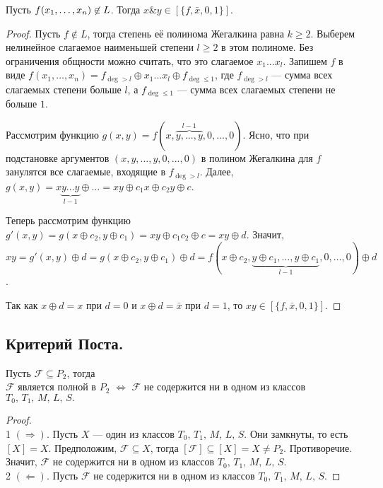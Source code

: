 \begin{lemma} Пусть $f(x_1, \ldots, x_n)\not\in L$. Тогда $x\& y \in [\{f, \bar{x}, 0, 1\}].$
\end{lemma}
\begin{proof} Пусть $f\not\in L$, тогда степень её полинома Жегалкина равна $k \geq 2$. Выберем нелинейное слагаемое наименьшей степени $l\geq 2$ в этом полиноме. Без ограничения общности можно считать, что это слагаемое $x_1...x_l$. Запишем $f$ в виде $f(x_1,\ldots,x_n) = f_{\deg > l} \oplus x_1...x_l \oplus f_{\deg \leq 1}$, где $f_{\deg > l}$ --- сумма всех слагаемых степени больше $l$, а $f_{\deg \leq 1}$ --- сумма всех слагаемых степени не больше $1$.

Рассмотрим функцию $g(x,y) = f(x, \overbrace{y,...,y}^{l-1}, 0,...,0)$. Ясно, что при подстановке аргументов $(x, y,...,y, 0,...,0)$ в полином Жегалкина для $f$ занулятся все слагаемые, входящие в $f_{\deg > l}$. 
Далее, $g(x,y) = x\underbrace{y...y}_{l-1} \oplus \ldots = xy \oplus c_1x \oplus c_2y \oplus c$. 

Теперь рассмотрим функцию $g'(x,y) = g(x\oplus c_2, y\oplus c_1) = xy \oplus c_1c_2 \oplus c = xy \oplus d$. Значит, $xy = g'(x,y) \oplus d = g(x\oplus c_2, y\oplus c_1) \oplus d = f(x \oplus c_2, \underbrace{y\oplus c_1,\ldots,y\oplus c_1}_{l-1},0,\ldots,0)\oplus d$. 

Так как %
$x\oplus d = x$ при $d=0$ и $x\oplus d = \bar{x}$ при $d=1$, то $xy \in [\{f, \bar{x}, 0, 1\}].$
\end{proof}

\subsection{Критерий Поста.}
\begin{theorem} Пусть $\mathcal{F} \subseteq P_2$, тогда \\ $\mathcal{F}$ является полной в $P_2$ $\Longleftrightarrow$ $\mathcal{F}$ не содержится ни в одном из классов $ T_0,\, T_1,\,M,\,L,\,S.$
\end{theorem}
\begin{proof}
~\\
1 $(\Rightarrow)$. Пусть $X$ --- один из классов $ T_0,\, T_1,\,M,\,L,\,S$. Они замкнуты, то есть $[X] = X$.
Предположим, $\mathcal{F} \subseteq X $, тогда $[\mathcal{F}] \subseteq [X] = X \neq P_2 $. Противоречие. Значит, $\mathcal{F}$ не содержится ни в одном из классов $ T_0,\, T_1,\,M,\,L,\,S.$
~\\
2 $(\Leftarrow)$. Пусть $\mathcal{F}$ не содержится ни в одном из классов $ T_0,\, T_1,\,M,\,L,\,S$.
\end{proof}